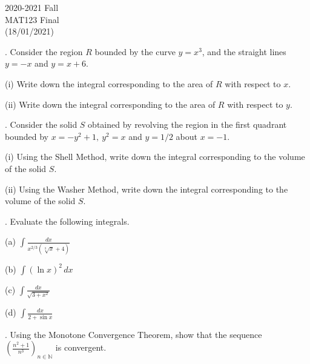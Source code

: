 \documentclass{article}
\begin{document}
\pagestyle{empty}
\large

\begin{center}
2020-2021 Fall \\MAT123 Final\\(18/01/2021)
\end{center}

. Consider the region $R$ bounded by the curve $y=x^3$, and the straight lines $y=-x$ and $y=x+6$.

\hfill

\noindent (i) Write down the integral corresponding to the area of $R$ with respect to $x$.

\hfill

\noindent (ii) Write down the integral corresponding to the area of $R$ with respect to $y$.

\hfill

. Consider the solid $S$ obtained by revolving the region in the first quadrant bounded by $x=-y^2+1,\:y^2=x$ and $y=1/2$ about $x=-1$.

\hfill

\noindent (i) Using the Shell Method, write down the integral corresponding to the volume of the solid $S$.

\hfill

\noindent (ii) Using the Washer Method, write down the integral corresponding to the volume of the solid $S$.

\hfill

. Evaluate the following integrals.

\hfill

\noindent (a) $\displaystyle\int\frac{dx}{x^{2/3}\left(\sqrt[3]{x}+4\right)}$

\hfill

\hfill

\noindent (b) $\displaystyle\int(\ln x)^2\,dx$

\hfill

\hfill

\noindent (c) $\displaystyle\int\frac{dx}{\sqrt{3+x^2}}$

\hfill

\hfill

\noindent (d) $\displaystyle\int\frac{dx}{2+\sin x}$

\hfill

\hfill

. Using the Monotone Convergence Theorem, show that the sequence  $\displaystyle\left(\frac{n^2+1}{n^3}\right)_{n\in\mathbb{N}}$ is convergent.
\end{document}
